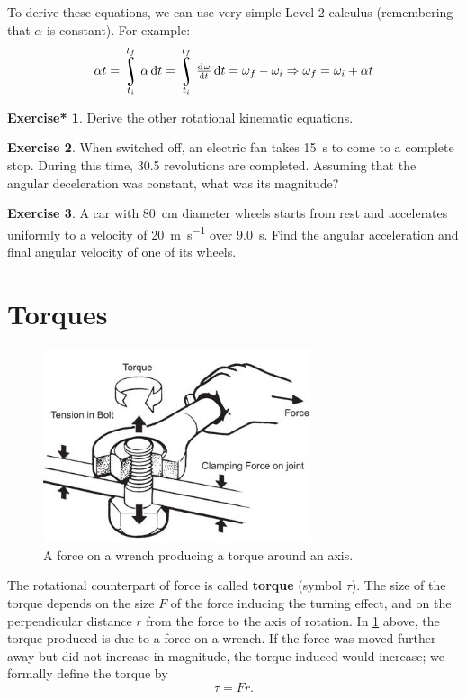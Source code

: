\documentclass[a4paper]{amsbook}
\theoremstyle{definition}
\newtheorem{exercise}{Exercise}
\numberwithin{exercise}{chapter}
\newtheorem{exercise*}[exercise]{Exercise*}
\numberwithin{exercise}{chapter}
\DeclareMathOperator*{\rint}{\scalerel*{\rotatebox{17}{$\!\int\!$}}{\int}}
\begin{document}
To derive these equations, we can use very simple Level 2 calculus (remembering that $ \alpha $ is constant). For example:
\begin{gather*}
  \alpha t = \rint_{t_i}^{t_f} \alpha \dif{t} = \rint_{t_i}^{t_f} \od{\omega}{t} \dif{t} = \omega_f - \omega_i \Rightarrow \omega_f = \omega_i + \alpha t\\
\end{gather*}

\begin{exercise*}
  Derive the other rotational kinematic equations.
\end{exercise*}

\begin{exercise}
  When switched off, an electric fan takes \SI{15}{\second} to come to a complete stop. During this time,
  30.5 revolutions are completed. Assuming that the angular deceleration was constant, what was its magnitude?
\end{exercise}

\begin{exercise}
  A car with \SI{80}{\centi\metre} diameter wheels starts from rest and accelerates uniformly to a velocity of \SI{20}{\metre\per\second}
  over \SI{9.0}{\second}. Find the angular acceleration and final angular velocity of one of its wheels.
\end{exercise}

\section{Torques}
\begin{figure}
  \centering
  \includegraphics[width=0.7\textwidth]{torque}
  \caption{A force on a wrench producing a torque around an axis.\label{fig:torque}}
\end{figure}
The rotational counterpart of force is called \textbf{torque} (symbol $ \tau $). The size of the torque depends
on the size $ F $ of the force inducing the turning effect, and on the perpendicular distance $ r $ from the force
to the axis of rotation. In \cref{fig:torque} above, the torque produced is due to a force on a wrench. If the
force was moved further away but did not increase in magnitude, the torque induced would increase; we formally
define the torque by
\begin{equation}
  \tau = Fr.
\end{equation}
\end{document}
